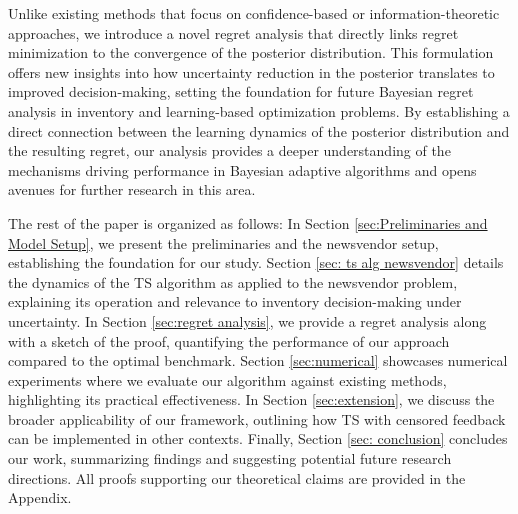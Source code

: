 Unlike existing methods that focus on confidence-based or information-theoretic approaches, we introduce a novel regret analysis that directly links regret minimization to the convergence of the posterior distribution. This formulation offers new insights into how uncertainty reduction in the posterior translates to improved decision-making, setting the foundation for future Bayesian regret analysis in inventory and learning-based optimization problems. By establishing a direct connection between the learning dynamics of the posterior distribution and the resulting regret, our analysis provides a deeper understanding of the mechanisms driving performance in Bayesian adaptive algorithms and opens avenues for further research in this area.

The rest of the paper is organized as follows: In Section \ref{sec:Preliminaries and Model Setup}, we present the preliminaries and the newsvendor setup, establishing the foundation for our study. Section \ref{sec: ts alg newsvendor} details the dynamics of the TS algorithm as applied to the newsvendor problem, explaining its operation and relevance to inventory decision-making under uncertainty. In Section \ref{sec:regret analysis}, we provide a regret analysis along with a sketch of the proof, quantifying the performance of our approach compared to the optimal benchmark. Section \ref{sec:numerical} showcases numerical experiments where we evaluate our algorithm against existing methods, highlighting its practical effectiveness. In Section \ref{sec:extension}, we discuss the broader applicability of our framework, outlining how TS with censored feedback can be implemented in other contexts. Finally, Section \ref{sec: conclusion} concludes our work, summarizing findings and suggesting potential future research directions. All proofs supporting our theoretical claims are provided in the Appendix.